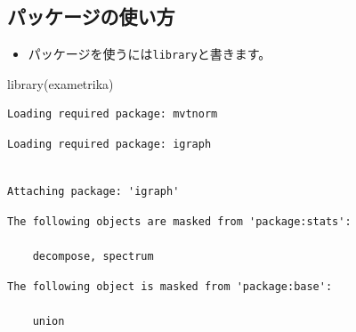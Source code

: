 \documentclass[
  a4paper,
]{ltjsbook}
\newenvironment{Shaded}{\begin{snugshade}}{\end{snugshade}}
\newcommand{\FunctionTok}[1]{\textcolor[rgb]{0.28,0.35,0.67}{#1}}
\newcommand{\NormalTok}[1]{\textcolor[rgb]{0.00,0.23,0.31}{#1}}
\providecommand{\tightlist}{%
  \setlength{\itemsep}{0pt}\setlength{\parskip}{0pt}}\usepackage{longtable,booktabs,array}
\begin{document}
\subsection{パッケージの使い方}\label{ux30d1ux30c3ux30b1ux30fcux30b8ux306eux4f7fux3044ux65b9}

\begin{itemize}
\tightlist
\item
  パッケージを使うには\texttt{library}と書きます。
\end{itemize}

\begin{Shaded}
\begin{Highlighting}[]
\FunctionTok{library}\NormalTok{(exametrika)}
\end{Highlighting}
\end{Shaded}

\begin{verbatim}
Loading required package: mvtnorm
\end{verbatim}

\begin{verbatim}
Loading required package: igraph
\end{verbatim}

\begin{verbatim}

Attaching package: 'igraph'
\end{verbatim}

\begin{verbatim}
The following objects are masked from 'package:stats':

    decompose, spectrum
\end{verbatim}

\begin{verbatim}
The following object is masked from 'package:base':

    union
\end{verbatim}
\end{document}
